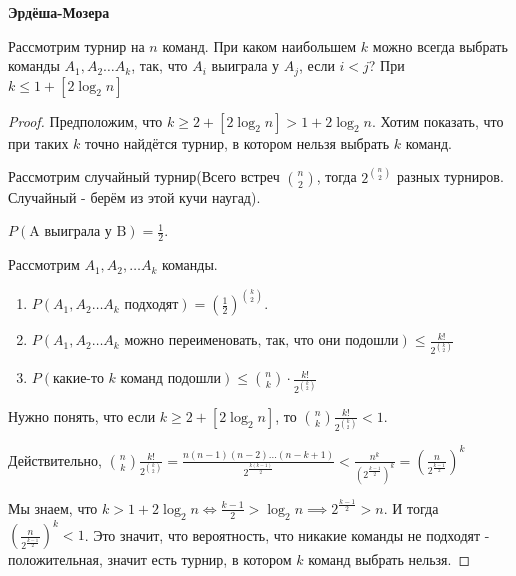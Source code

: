 \begin{theorem}
    \textbf{Эрдёша-Мозера}

    Рассмотрим турнир на $n$ команд. При каком наибольшем $k$ можно
    всегда выбрать команды $A_1, A_2 \ldots A_k$, так, что $A_i$
    выиграла у $A_j$, если $i < j$? При $k \leqslant 1 +  [2 \log_2 n] $
\end{theorem}

\begin{proof}
    Предположим, что $k \geqslant 2 + [2 \log_2 n] > 1 + 2 \log_2 n$. Хотим показать, что
    при таких $k$ точно найдётся турнир, в котором нельзя выбрать $k$ команд.

    Рассмотрим случайный турнир(Всего встреч $\binom{n}{2}$, тогда
    $2^{\binom{n}{2}}$ разных турниров. Случайный - берём из этой
    кучи наугад).

    $P(\text{A выиграла у B}) = \frac{1}{2}$.

    Рассмотрим $A_1, A_2, \ldots A_k$ команды.

    \begin{enumerate}
        \item {
            $P(A_1, A_2 \ldots A_k  \text{ подходят}) = (\frac{1}{2})^{\binom{k}{2}}$.
        }
        \item {
            $P(A_1, A_2 \ldots A_k \text{ можно переименовать, так, что они подошли}) \leqslant \frac{k!}{2^{\binom{k}{2}}}$
        }
        \item {
            $P(\text{какие-то $k$ команд подошли}) \leqslant \binom{n}{k} \cdot \frac{k!}{2^{\binom{k}{2}}}$
        }
    \end{enumerate}

    Нужно понять, что если $k \geqslant 2 + [2\log_2 n]$, то $\binom{n}{k} \frac{k!}{2^{\binom{k}{2}}} < 1$.

    Действительно, $\binom{n}{k} \frac{k!}{2^{\binom{k}{2}}} = \frac{n(n - 1)(n - 2) \ldots (n - k + 1)}{2^{\frac{k(k - 1)}{2}}} < \frac{n^k}{(2^{\frac{k - 1}{2}})^k} =
    \left( \frac{n}{2^{\frac{k - 1}{2}}}\right)^k$

    Мы знаем, что $k > 1 + 2 \log_2 n \Leftrightarrow \frac{k - 1}{2} > \log_2 n \implies 2^{\frac{k - 1}{2}} > n$. И тогда $\left( \frac{n}{2^{\frac{k - 1}{2}}}\right)^k < 1$.
    Это значит, что вероятность, что никакие команды не подходят - положительная, значит есть турнир, в котором $k$ команд выбрать нельзя.
\end{proof}



